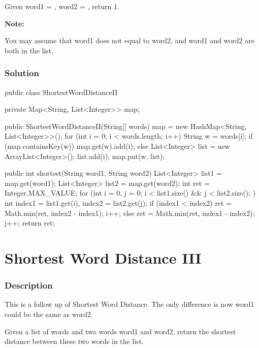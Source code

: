 Given word1 = , word2 = , return 1.

\textbf{Note:}

You may assume that word1 does not equal to word2, and word1 and word2 are both in the list.

\subsubsection{Solution}

\begin{Code}
public class ShortestWordDistanceII {

    private Map<String, List<Integer>> map;

    public ShortestWordDistanceII(String[] words) {
        map = new HashMap<String, List<Integer>>();
        for (int i = 0; i < words.length; i++) {
            String w = words[i];
            if (map.containsKey(w)) {
                map.get(w).add(i);
            } else {
                List<Integer> list = new ArrayList<Integer>();
                list.add(i);
                map.put(w, list);
            }
        }
    }

    public int shortest(String word1, String word2) {
        List<Integer> list1 = map.get(word1);
        List<Integer> list2 = map.get(word2);
        int ret = Integer.MAX_VALUE;
        for (int i = 0, j = 0; i < list1.size() && j < list2.size(); ) {
            int index1 = list1.get(i), index2 = list2.get(j);
            if (index1 < index2) {
                ret = Math.min(ret, index2 - index1);
                i++;
            } else {
                ret = Math.min(ret, index1 - index2);
                j++;
            }
        }
        return ret;
    }
}
\end{Code}

\newpage

\section{ Shortest Word Distance III} %

\subsubsection{Description}
This is a follow up of Shortest Word Distance. The only difference is now word1 could be the same as word2.

Given a list of words and two words word1 and word2, return the shortest distance between these two words in the list.

